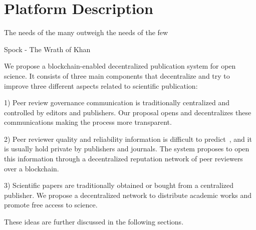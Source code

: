\chapter{Platform Description}

\begin{FraseCelebre}
  \begin{Frase}
    The needs of the many outweigh the needs of the few
  \end{Frase}
  \begin{Fuente}
    Spock - The Wrath of Khan
  \end{Fuente}
\end{FraseCelebre}

We propose a blockchain-enabled decentralized publication system for open
science. It consists of three main components that decentralize and try to
improve three different aspects related to scientific publication:

1) Peer review governance communication is traditionally centralized and
controlled by editors and publishers. Our proposal opens and decentralizes these
communications making the process more transparent.

2) Peer reviewer quality and reliability information is difficult to
predict~\cite{callaham_relationship_2007}, and it is usually hold private by
publishers and journals. The system proposes to open this information through a
decentralized reputation network of peer reviewers over a blockchain.

3) Scientific papers are traditionally obtained or bought from a centralized
publisher. We propose a decentralized network to distribute academic works and
promote free access to science.

These ideas are further discussed in the following sections.




